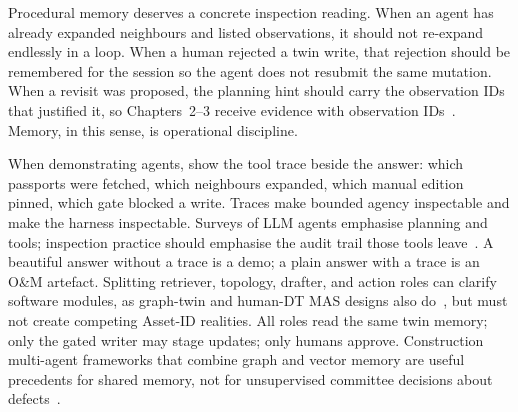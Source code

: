 Procedural memory deserves a concrete inspection reading. When an agent has already expanded neighbours and listed observations, it should not re-expand endlessly in a loop. When a human rejected a twin write, that rejection should be remembered for the session so the agent does not resubmit the same mutation. When a revisit was proposed, the planning hint should carry the observation IDs that justified it, so Chapters~2--3 receive evidence with observation IDs~\cite{yao2023react,rawat2025llmmas}. Memory, in this sense, is operational discipline.



When demonstrating agents, show the tool trace beside the answer: which passports were fetched, which neighbours expanded, which manual edition pinned, which gate blocked a write. Traces make bounded agency inspectable and make the harness inspectable. Surveys of LLM agents emphasise planning and tools; inspection practice should emphasise the audit trail those tools leave~\cite{wang2024surveyagents,li2024surveymultiagent,yao2023react,schick2023toolformer,liang2023helm}. A beautiful answer without a trace is a demo; a plain answer with a trace is an O\&M artefact. Splitting retriever, topology, drafter, and action roles can clarify software modules, as graph-twin and human-DT MAS designs also do~\cite{pan2026graphdtgpt,lu2026highwaymas}, but must not create competing Asset-ID realities. All roles read the same twin memory; only the gated writer may stage updates; only humans approve. Construction multi-agent frameworks that combine graph and vector memory are useful precedents for shared memory, not for unsupervised committee decisions about defects~\cite{rawat2025llmmas,gao2026ifcagent,luo2025llmdtrobot}.

